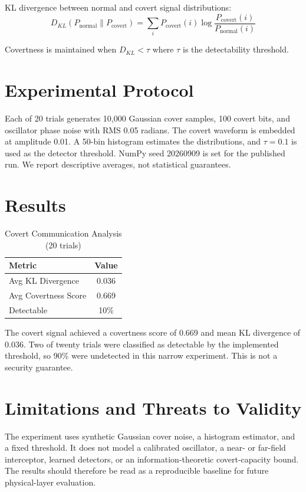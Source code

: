 \documentclass[sigconf]{acmart}
\begin{document}
KL divergence between normal and covert signal distributions:
\begin{equation}
D_{KL}(P_{\text{normal}} \| P_{\text{covert}}) = \sum_i P_{\text{covert}}(i) \log \frac{P_{\text{covert}}(i)}{P_{\text{normal}}(i)}
\end{equation}

Covertness is maintained when $D_{KL} < \tau$ where $\tau$ is the detectability threshold.

\section{Experimental Protocol}

Each of 20 trials generates 10,000 Gaussian cover samples, 100 covert bits, and oscillator phase noise with RMS 0.05 radians. The covert waveform is embedded at amplitude 0.01. A 50-bin histogram estimates the distributions, and $\tau=0.1$ is used as the detector threshold. NumPy seed 20260909 is set for the published run. We report descriptive averages, not statistical guarantees.

\section{Results}

\begin{table}[h]
\centering
\caption{Covert Communication Analysis (20 trials)}
\begin{tabular}{lc}
\toprule
Metric & Value \\
\midrule
Avg KL Divergence & 0.036 \\
Avg Covertness Score & 0.669 \\
Detectable & 10\% \\
\bottomrule
\end{tabular}
\end{table}

The covert signal achieved a covertness score of 0.669 and mean KL divergence of 0.036. Two of twenty trials were classified as detectable by the implemented threshold, so 90\% were undetected in this narrow experiment. This is not a security guarantee.

\section{Limitations and Threats to Validity}

The experiment uses synthetic Gaussian cover noise, a histogram estimator, and a fixed threshold. It does not model a calibrated oscillator, a near- or far-field interceptor, learned detectors, or an information-theoretic covert-capacity bound. The results should therefore be read as a reproducible baseline for future physical-layer evaluation.
\end{document}

